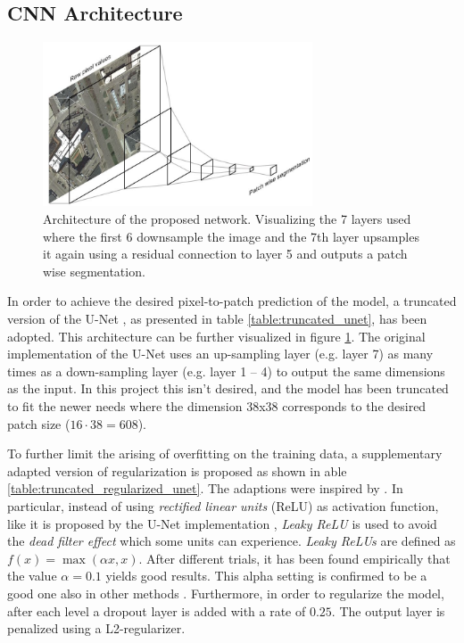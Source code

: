 \documentclass[10pt,conference,compsocconf]{IEEEtran}
\begin{document}
\subsection{CNN Architecture}\label{architectures}

\begin{figure}
\includegraphics[width={8cm}]{network-visualisation}
\caption{Architecture of the proposed network. Visualizing the 7 layers used where the first 6 downsample the image and the 7th layer upsamples it again using a residual connection to layer 5 and outputs a patch wise segmentation.}
\label{fig:architecture}
\end{figure}

In order to achieve the desired pixel-to-patch prediction of the model, a truncated version of the U-Net \cite{Ronneberger2015}, as presented in table \ref{table:truncated_unet}, has been adopted. This architecture can be further visualized in figure \ref{fig:architecture}. The original implementation of the U-Net uses an up-sampling layer (e.g. layer 7) as many times as a down-sampling layer (e.g. layer 1 – 4) to output the same dimensions as the input. In this project this isn't desired, and the model has been truncated to fit the newer needs where the dimension 38x38 corresponds to the desired patch size ($16 \cdot 38 = 608$).

To further limit the arising of overfitting on the training data, a supplementary adapted version of regularization is proposed as shown in able \ref{table:truncated_regularized_unet}. The adaptions were inspired by \cite{Pavllo2017}. In particular, instead of using \textit{rectified linear units} (ReLU) as activation function, like it is proposed by the U-Net implementation \cite{Ronneberger2015}, \textit{Leaky ReLU} is used to avoid the \textit{dead filter effect} which some units can experience. \textit{Leaky ReLUs} are defined as $f(x) = \max(\alpha x, x)$. After different trials, it has been found empirically that the value $\alpha=0.1$ yields good results. This alpha setting is confirmed to be a good one also in other methods \cite{Pavllo2017}. Furthermore, in order to regularize the model, after each level a dropout layer is added with a rate of $0.25$. The output layer is penalized using a L2-regularizer.
\end{document}
